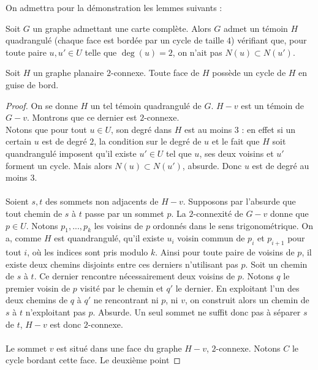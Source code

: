 \documentclass{scrartcl}
\begin{document}
\begin{flushleft}
On admettra pour la démonstration les lemmes suivants :

\begin{lem}
    Soit $G$ un graphe admettant une carte complète. Alors $G$ admet un témoin $H$ quadrangulé (chaque face est bordée par un cycle
    de taille $4$) vérifiant que, pour toute paire $u, u' \in U$ telle que $\deg(u) = 2$, on n'ait pas $N(u) \subset N(u')$.
\end{lem}

\begin{lem}
    Soit $H$ un graphe planaire $2$-connexe. Toute face de $H$ possède un cycle de $H$ en guise de bord.
\end{lem}

\begin{proof}
    On se donne $H$ un tel témoin quadrangulé de $G$. $H-v$ est un témoin de $G-v$. Montrons que ce dernier est $2$-connexe.\\
    Notons que pour tout $u \in U$, son degré dans $H$ est au moins $3$ : en effet si un certain $u$ est de degré $2$,
    la condition sur le degré de $u$ et le fait que $H$ soit quandrangulé imposent qu'il existe $u' \in U$ tel que $u$,
    ses deux voisins et $u'$ forment un cycle. Mais alors $N(u) \subset N(u')$, absurde. Donc $u$ est de degré au moins $3$.
    \\~\\
    Soient $s, t$ des sommets non adjacents de $H-v$. Supposons par l'absurde que tout chemin de $s$ à $t$ passe par un sommet
    $p$. La $2$-connexité de $G-v$ donne que $p \in U$. Notons $p_1, ..., p_k$ les voisins de $p$ ordonnés dans le sens trigonométrique.
    On a, comme $H$ est quandrangulé, qu'il existe $u_i$ voisin commun de $p_i$ et $p_{i+1}$ pour tout $i$, où les indices sont
    pris modulo $k$. Ainsi pour toute paire de voisins de $p$, il existe deux chemins disjoints entre ces derniers n'utilisant pas $p$.
    Soit un chemin de $s$ à $t$. Ce dernier rencontre nécessairement deux voisins de $p$. Notons $q$ le premier voisin de $p$
    visité par le chemin et $q'$ le dernier. En exploitant l'un des deux chemins de $q$ à $q'$ ne rencontrant ni $p$, ni $v$,
    on construit alors un chemin de $s$ à $t$ n'exploitant pas $p$. Absurde. Un seul sommet ne suffit donc pas à séparer $s$ de $t$,
    $H-v$ est donc $2$-connexe.
    \\~\\
    Le sommet $v$ est situé dans une face du graphe $H-v$, $2$-connexe. Notons $C$ le cycle bordant cette face. Le deuxième point

\end{proof}
\end{flushleft}
\end{document}

